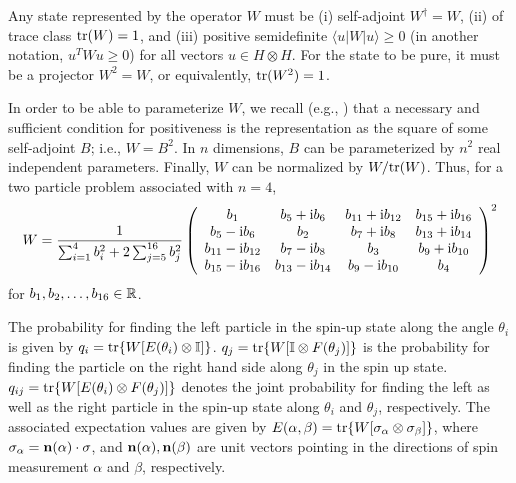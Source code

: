 \documentclass[pra,showpacs,showkeys,amsfonts]{revtex4}
\begin{document}
Any state represented by the operator $W$ must be
(i) self-adjoint $W^\dagger =W$,
(ii) of trace class ${\rm tr} (W)=1$, and
(iii) positive semidefinite
$\langle u | W | u \rangle \ge 0$
(in another notation, $u^TWu\ge 0$)
for all vectors $u\in H\otimes H$.
For the state to be pure, it must be a projector $W^2=W$,
or equivalently, ${\rm tr}(W^2)=1$.

In order to be able to parameterize $W$,
we recall (e.g., \cite[\S 72]{halmos-vs})
that a necessary and sufficient condition for
positiveness is the representation as the square of
some self-adjoint $B$; i.e., $W=B^2$.
In $n$ dimensions, $B$ can be parameterized by $n^2$
real independent parameters. Finally, $W$ can be normalized
by $W/ {\rm tr}(W)$.
Thus, for a two particle problem associated with $n=4$,
\begin{equation}
    \label{e-2003-qpoly-2}
    W=\frac{1}{\sum_{i=1}^4 b_i^2 + 2 \sum_{j=5}^{16} b_j^2}\left(\begin{array}{cccc}
        b_1 & b_5 + {\rm i}b_6 & b_{11} + {\rm i}b_{12} & b_{15} + {\rm i}b_{16}\\
        b_5 - {\rm i}b_6 & b_2 & b_7 + {\rm i}b_8 & b_{13} + {\rm i}b_{14}\\
        b_{11} - {\rm i}b_{12} & b_7 - {\rm i}b_8 & b_3 & b_9 + {\rm i}b_{10}\\
        b_{15} - {\rm i}b_{16} & b_{13} - {\rm i}b_{14} & b_9 - {\rm i}b_{10} &b_4
      \end{array}\right)^2
\end{equation}
for $b_1,b_2,\ldots ,b_{16}\in {\Bbb R}$.

The probability for finding the left particle in the spin-up state
along the angle $\theta_i$ is given  by
$q_i = {\rm tr}\{{W} [{E}(\theta_i) \otimes {\Bbb I}]\}$.
$q_j = {\rm tr}\{{W} [{\Bbb I} \otimes {F}(\theta_j)]\}$ is
the probability for finding the particle on the right hand side along $\theta_j$ in the
spin up state.
$q_{ij} = {\rm tr}\{{W} [{E}(\theta_i) \otimes {F}(\theta_j)]\}$ denotes the joint probability
for finding the left as well as the right particle in the spin-up state along $\theta_i$ and $\theta_j$,
respectively.
The associated expectation values are given by
$E(\alpha,\beta)={\rm tr}\{{W} [{\bf \sigma}_\alpha  \otimes
{\bf \sigma}_\beta ]\}$,
where $\sigma_\alpha= {\bf n}(\alpha )\cdot {\bf \sigma}$,
and ${\bf n}(\alpha ),{\bf n}(\beta )$
are unit vectors pointing in the directions
of spin measurement $\alpha$ and $\beta$, respectively.
\end{document}
